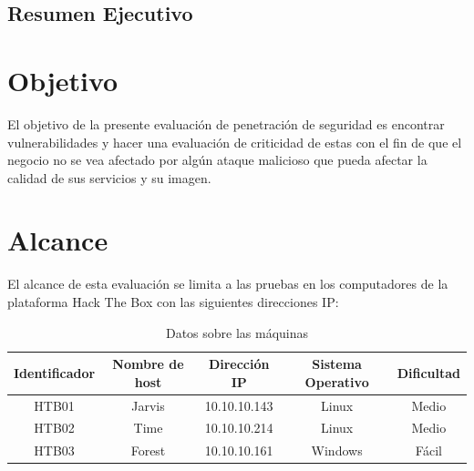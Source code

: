 \documentclass[a4paper]{article}
\begin{document}
    
    \clearpage
        \tableofcontents
    \clearpage
    \listoffigures
    \clearpage
    \cfoot{\thepage}
    \setcounter{page}{1}
    \begin{center}
        \section*{Resumen Ejecutivo}
    \end{center}
    \vspace{0.1cm}

    \clearpage
    \section{Objetivo}
        \large{El objetivo de la presente evaluación de penetración de seguridad es encontrar vulnerabilidades y hacer una evaluación de criticidad de estas con el fin de que el negocio no se vea afectado por algún ataque malicioso que pueda afectar la calidad de sus servicios y su imagen.}
        \par
    \section{Alcance}
        \large{El alcance de esta evaluación se limita a las pruebas en los computadores de la plataforma Hack The Box con las siguientes direcciones IP:}
        \par
        \begin{table}[h]
            \centering
                \begin{tabular}{|c|c|c|c|c|} \hline
                    Identificador & Nombre de host & Dirección IP & Sistema Operativo & Dificultad \\ \hline
                    HTB01 & Jarvis & 10.10.10.143 & Linux & Medio \\ \hline
                    HTB02 & Time & 10.10.10.214 & Linux & Medio \\ \hline
                    HTB03 & Forest & 10.10.10.161 & Windows & Fácil \\ \hline
                \end{tabular}
                \caption{Datos sobre las máquinas}
        \end{table}
        \par
\end{document}
